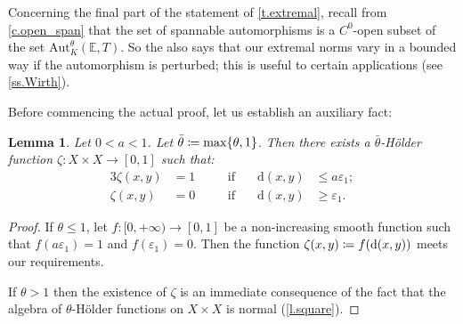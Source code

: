 \documentclass[JEP,XML,SOM,Unicode]{cedram}
\def\vcentcolon{\mathrel{\mathop\ordinarycolon}}
\providecommand\ordinarycolon{:}
\providecommand*\coloneqq{\vcentcolon\mathrel{\mkern-1.2mu}=}
\theoremstyle{plain}
\newtheorem{lemma}[theorem]{Lemma}
\theoremstyle{definition}
\newcommand{\EE}{\mathbb{E}}
\newcommand{\dd}{\mathrm{d}}
\newcommand{\Aut}{\mathrm{Aut}}
\let\epsilon\varepsilon
\begin{document}
Concerning the final part of the statement of \cref{t.extremal}, recall from \cref{c.open_span} that the set of spannable automorphisms is a $C^0$-open subset of the set $\Aut^\theta_K(\EE,T)$.
So the  also says that our extremal norms vary in a bounded way if the automorphism is perturbed; this is useful to certain applications (see \cref{ss.Wirth}).

Before commencing the actual proof, let us establish an auxiliary fact:

\begin{lemma}\label{l.bump}
Let $0<a<1$.
Let $\bar\theta \coloneqq \max\{\theta,1\}$.
Then there exists a $\bar{\theta}$-Hölder function $\zeta \colon X \times X \to [0,1]$ such that:
\begin{alignat*}{3}
\zeta(x,y) &= 1 &\quad &\text{if} &\quad \dd(x,y) &\le a\epsilon_1 ; \\
\zeta(x,y) &= 0 &\quad &\text{if} &\quad \dd(x,y) &\ge \epsilon_1.
\end{alignat*}
\end{lemma}

\begin{proof}
If $\theta \le 1$, let $f \colon [0,+\infty) \to [0,1]$ be a non-increasing smooth function such that $f(a\epsilon_1)=1$ and $f(\epsilon_1)=0$. Then the function $\zeta(x,y) \coloneqq f(\dd(x,y))$ meets our requirements.

If $\theta > 1$ then the existence of $\zeta$ is an immediate consequence of the fact that the algebra of $\theta$-Hölder functions on $X \times X$ is normal (\cref{l.square}).
\end{proof}
\end{document}
